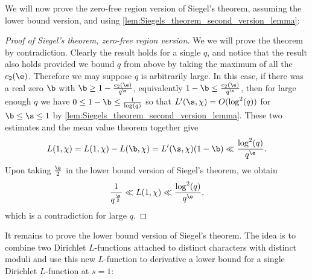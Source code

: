       We will now prove the zero-free region version of Siegel's theorem, assuming the lower bound version, and using \cref{lem:Siegels_theorem_second_version_lemma}:

      \begin{proof}[Proof of Siegel's theorem, zero-free region version]
        We we will prove the theorem by contradiction. Clearly the result holds for a single $q$, and notice that the result also holds provided we bound $q$ from above by taking the maximum of all the $c_{2}(\e)$. Therefore we may suppose $q$ is arbitrarily large. In this case, if there was a real zero $\b$ with $\b \ge 1-\frac{c_{2}(\e)}{q^{\e}}$, equivalently $1-\b \le \frac{c_{2}(\e)}{q^{\e}}$, then for large enough $q$ we have $0 \le 1-\b \le \frac{1}{\log(q)}$ so that $L'(\s,\chi) = O(\log^{2}(q))$ for $\b \le \s \le 1$ by \cref{lem:Siegels_theorem_second_version_lemma}. These two estimates and the mean value theorem together give
        \[
          L(1,\chi) = L(1,\chi)-L(\b,\chi) = L'(\s,\chi)(1-\b) \ll \frac{\log^{2}(q)}{q^{\e}}.
        \]
        Upon taking $\frac{\e}{2}$ in the lower bound version of Siegel's theorem, we obtain
        \[
          \frac{1}{q^{\frac{\e}{2}}} \ll L(1,\chi) \ll \frac{\log^{2}(q)}{q^{\e}},
        \]
        which is a contradiction for large $q$.
      \end{proof}

      It remains to prove the lower bound version of Siegel's theorem. The idea is to combine two Dirichlet $L$-functions attached to distinct characters with distinct moduli and use this new $L$-function to derivative a lower bound for a single Dirichlet $L$-function at $s = 1$:


